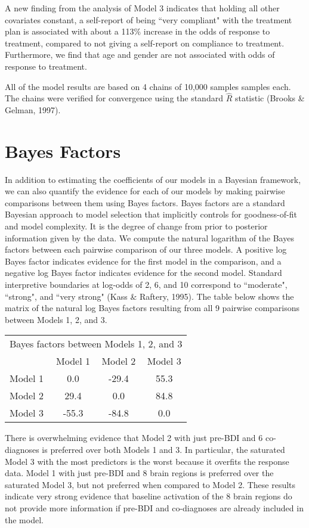 \documentclass[12pt,doc]{apa}
\begin{document}
A new finding from the analysis of Model 3 indicates that holding all other covariates constant, a self-report of being ``very compliant" with the treatment plan is associated with about a 113\% increase in the odds of response to treatment, compared to not giving a self-report on compliance to treatment. Furthermore, we find that age and gender are not associated with odds of response to treatment.

All of the model results are based on 4 chains of 10,000 samples samples each. The chains were verified for convergence using the standard $\hat{R}$ statistic (Brooks \& Gelman, 1997).

\section{Bayes Factors}
In addition to estimating the coefficients of our models in a Bayesian framework, we can also quantify the evidence for each of our models by making pairwise comparisons between them using Bayes factors. Bayes factors are a standard Bayesian approach to model selection that implicitly controls for goodness-of-fit and model complexity. It is the degree of change from prior to posterior information given by the data. We compute the natural logarithm of the Bayes factors between each pairwise comparison of our three models. A positive log Bayes factor indicates evidence for the first model in the comparison, and a negative log Bayes factor indicates evidence for the second model. Standard interpretive boundaries at log-odds of 2, 6, and 10 correspond to ``moderate", ``strong", and ``very strong" (Kass \& Raftery, 1995). The table below shows the matrix of the natural log Bayes factors resulting from all 9 pairwise comparisons between Models 1, 2, and 3.
\medskip

\begin{tabular}{l| c c c}
\multicolumn{4}{l}{Bayes factors between Models 1, 2, and 3} \\

& Model 1 & Model 2 & Model 3 \\
\hline
Model 1 & 0.0 & -29.4 & 55.3 \\
Model 2 & 29.4 & 0.0 & 84.8 \\
Model 3 & -55.3 & -84.8 & 0.0

\end{tabular}
\medskip

There is overwhelming evidence that Model 2 with just pre-BDI and 6 co-diagnoses is preferred over both Models 1 and 3. In particular, the saturated Model 3 with the most predictors is the worst because it overfits the response data. Model 1 with just pre-BDI and 8 brain regions is preferred over the saturated Model 3, but not preferred when compared to Model 2. These results indicate very strong evidence that baseline activation of the 8 brain regions do not provide more information if pre-BDI and co-diagnoses are already included in the model.
\end{document}
